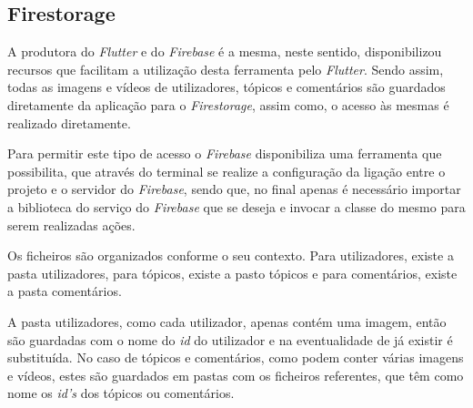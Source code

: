 \subsection{Firestorage}

A produtora do \textit{Flutter} e do \textit{Firebase} é a mesma, neste sentido, disponibilizou recursos que facilitam a utilização desta ferramenta pelo \textit{Flutter}. Sendo assim, todas as imagens e vídeos de utilizadores, tópicos e comentários são guardados diretamente da aplicação para o \textit{Firestorage}, assim como, o acesso às mesmas é realizado diretamente.

Para permitir este tipo de acesso o \textit{Firebase} disponibiliza uma ferramenta que possibilita, que através do terminal se realize a configuração da ligação entre o projeto e o servidor do \textit{Firebase}, sendo que, no final apenas é necessário importar a biblioteca do serviço do \textit{Firebase} que se deseja e invocar a classe do mesmo para serem realizadas ações.

Os ficheiros são organizados conforme o seu contexto. Para utilizadores, existe a pasta utilizadores, para tópicos, existe a pasto tópicos e para comentários, existe a pasta comentários. 


A pasta utilizadores, como cada utilizador, apenas contém uma imagem, então são guardadas com o nome do \textit{id} do utilizador e na eventualidade de já existir é substituída. No caso de tópicos e comentários, como podem conter várias imagens e vídeos, estes são guardados em pastas com os ficheiros referentes, que têm como nome os \emph{id's} dos tópicos ou comentários.

\begin{figure}[htb]%
 \centering
 \qquad
 \label{fig:76}%
\end{figure}